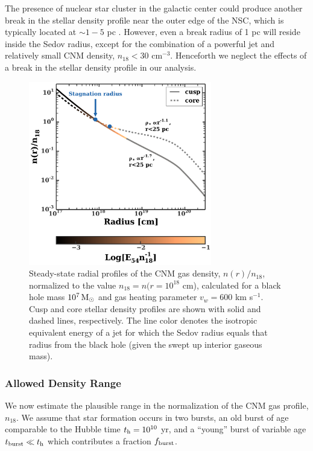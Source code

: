 \documentclass[usenatbib,fleqn]{mnras}
\newcommand{\Msun}{{\rm M_\odot}}
\begin{document}
The presence of nuclear star cluster in the galactic center could
produce another break in the stellar density profile near the outer
edge of the NSC, which is typically located at $\sim 1-5$ pc
\citep{Georgiev+2014}.  However, even a break radius of 1 pc will
reside inside the Sedov radius, except for the combination of a
powerful jet and relatively small CNM density, $n_{18}<30$ cm$^{-3}$.
Henceforth we neglect the effects of a break in the stellar density
profile in our analysis.


\begin{figure}
\includegraphics[width=8cm]{sedov_radius.pdf}
\caption{\label{fig:profiles} Steady-state radial profiles of the CNM
  gas density, $n(r)/n_{18}$, normalized to the value $n_{18} = n(r =
  10^{18}$ cm), calculated for a black hole mass $10^{7} \,\Msun$ and
  gas heating parameter $v_w=600$ km s$^{-1}$.  Cusp and core stellar
  density profiles are shown with solid and dashed lines,
  respectively.  The line color denotes the isotropic equivalent
  energy of a jet for which the Sedov radius equals that radius from
  the black hole (given the swept up interior gaseous mass).}
\end{figure}



\subsubsection{Allowed Density Range}
\label{sec:densAllowed}

We now estimate the plausible range in the normalization of the CNM gas profile, $n_{18}$.  We assume that star formation
occurs in two bursts, an old burst of age comparable to the Hubble
time $t_{\rm h} = 10^{10}$ yr, and a ``young'' burst of variable age
$t_{\rm burst} \ll t_{\rm h}$ which contributes a fraction $f_{\rm
  burst}$.
\end{document}
